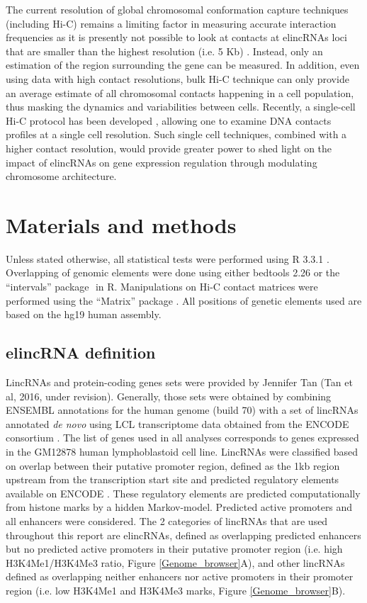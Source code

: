 \documentclass[11pt,a4paper]{report}
\begin{document}
The current resolution of global chromosomal conformation capture techniques (including Hi-C) remains a limiting factor in measuring accurate interaction frequencies as it is presently not possible to look at contacts at elincRNAs loci that are smaller than the highest resolution (i.e. 5 Kb) \cite{Rao2014}⁠. Instead, only an estimation of the region surrounding the gene can be measured. In addition, even using data with high contact resolutions, bulk Hi-C technique can only provide an average estimate of all chromosomal contacts happening in a cell population, thus masking the dynamics and variabilities between cells. Recently, a single-cell Hi-C protocol has been developed \cite{Nagano2013}⁠, allowing one to examine DNA contacts profiles at a single cell resolution. Such single cell techniques, combined with a higher contact resolution, would provide greater power to shed light on the impact of elincRNAs on gene expression regulation through modulating chromosome architecture.

\section*{Materials and methods}
Unless stated otherwise, all statistical tests were performed using R 3.3.1 \cite{RCoreTeam2016}⁠. Overlapping of genomic elements were done using either bedtools 2.26 \cite{Quinlan2010}⁠or the “intervals” package \cite{Bourgon2015}⁠ in R. Manipulations on Hi-C contact matrices were performed using the “Matrix” package \cite{Bates2016}⁠. All positions of genetic elements used are based on the hg19 human assembly.

\subsection*{elincRNA definition}

LincRNAs and protein-coding genes sets were provided by Jennifer Tan (Tan et al, 2016, under revision). Generally, those sets were obtained by combining ENSEMBL annotations for the human genome (build 70) with a set of lincRNAs annotated \textit{de novo} using LCL transcriptome data obtained from the ENCODE consortium \cite{ENCODEProject2012}. The list of genes used in all analyses corresponds to genes expressed in the GM12878 human lymphoblastoid cell line. LincRNAs were classified based on overlap between their putative promoter region, defined as the 1kb region upstream from the transcription start site and predicted regulatory elements available on ENCODE \cite{ENCODEProject2012}⁠. These regulatory elements are predicted computationally from histone marks by a hidden Markov-model. Predicted active promoters and all enhancers were considered. The 2 categories of lincRNAs that are used throughout this report are elincRNAs, defined as overlapping predicted enhancers but no predicted active promoters in their putative promoter region (i.e. high H3K4Me1/H3K4Me3 ratio, Figure \ref{Genome_browser}A), and other lincRNAs defined as overlapping neither enhancers nor active promoters in their promoter region (i.e. low H3K4Me1 and H3K4Me3 marks, Figure \ref{Genome_browser}B).
\end{document}
